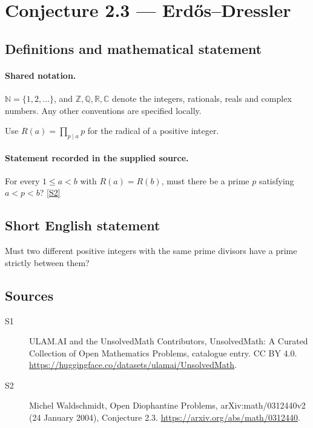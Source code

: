 \documentclass[11pt]{article}
\newcommand{\sref}[2]{\hyperlink{source:#1:#2}{[S#2]}}
\begin{document}
\section{Conjecture 2.3 — Erdős–Dressler}\label{statement}

\subsection{Definitions and mathematical statement}

\paragraph{Shared notation.}$\mathbb N=\{1,2,\ldots\}$, and $\mathbb Z,\mathbb Q,\mathbb R,\mathbb C$ denote the integers, rationals, reals and complex numbers. Any other conventions are specified locally.


Use $R(a)=\prod_{p\mid a}p$ for the radical of a positive integer.
\paragraph{Statement recorded in the supplied source.}
For every $1\le a<b$ with $R(a)=R(b)$, must there be a prime $p$ satisfying $a<p<b$? \sref{statement}{2}
\subsection{Short English statement}
Must two different positive integers with the same prime divisors have a prime strictly between them?
\subsection{Sources}
\begin{description}
\item[\hypertarget{source:statement:1}{S1}] ULAM.AI and the UnsolvedMath Contributors, UnsolvedMath: A Curated Collection of Open Mathematics Problems, catalogue entry. CC BY 4.0. \url{https://huggingface.co/datasets/ulamai/UnsolvedMath}.
\item[\hypertarget{source:statement:2}{S2}] Michel Waldschmidt, Open Diophantine Problems, arXiv:math/0312440v2 (24 January 2004), Conjecture 2.3. \url{https://arxiv.org/abs/math/0312440}.
\end{description}
\label{end:statement}
\end{document}
